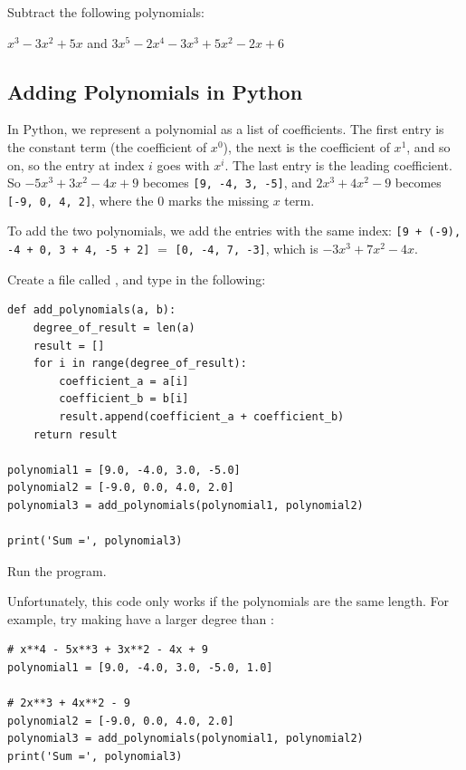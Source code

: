 \begin{Exercise}[title=Subtracting Polynomials Practice, label=subtractpns]
  Subtract the following polynomials:
  \vspace{20mm}
  \vspace{20mm}
\end{Exercise}
\begin{Answer}[ref=subtractpns]$x^3 - 3x^2 + 5x$ and $3x^5 - 2x^4 - 3x^3 + 5x^2 - 2x + 6$\end{Answer}

\subsection{Adding Polynomials in Python}

In Python, we represent a polynomial
as a list of coefficients. The first entry is the constant term (the
coefficient of $x^0$), the next is the coefficient of $x^1$, and so on, so
the entry at index $i$ goes with $x^i$. The last entry is the leading
coefficient. So $-5x^3 + 3x^2 - 4x + 9$ becomes \texttt{[9, -4, 3, -5]},
and $2x^3 + 4x^2 - 9$ becomes \texttt{[-9, 0, 4, 2]}, where the 0 marks
the missing $x$ term.

To add the two polynomials, we add the entries with the same index:
\texttt{[9 + (-9), -4 + 0, 3 + 4, -5 + 2]} $=$ \texttt{[0, -4, 7, -3]}, which
is $-3x^3 + 7x^2 - 4x$.

Create a file called , and type in the following: 
\begin{verbatim}
def add_polynomials(a, b):
    degree_of_result = len(a)
    result = []
    for i in range(degree_of_result):
        coefficient_a = a[i]
        coefficient_b = b[i]
        result.append(coefficient_a + coefficient_b)
    return result

polynomial1 = [9.0, -4.0, 3.0, -5.0]
polynomial2 = [-9.0, 0.0, 4.0, 2.0]
polynomial3 = add_polynomials(polynomial1, polynomial2)

print('Sum =', polynomial3)
\end{verbatim}

Run the program.

Unfortunately, this code only works if the polynomials are the same length. For
example, try making  have a larger degree than
:
\begin{verbatim}
# x**4 - 5x**3 + 3x**2 - 4x + 9
polynomial1 = [9.0, -4.0, 3.0, -5.0, 1.0]
  
# 2x**3 + 4x**2 - 9  
polynomial2 = [-9.0, 0.0, 4.0, 2.0]
polynomial3 = add_polynomials(polynomial1, polynomial2)
print('Sum =', polynomial3)
\end{verbatim}

